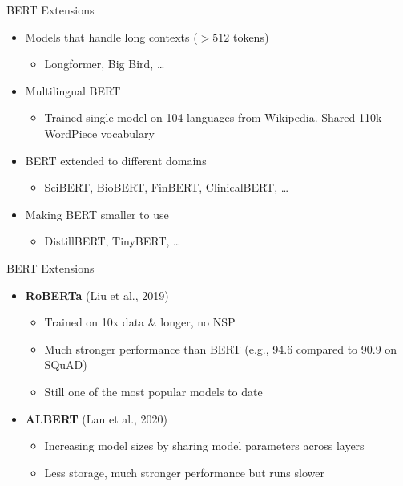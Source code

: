 \documentclass[serif, aspectratio=169]{beamer}
\begin{document}
\begin{frame}{BERT Extensions}
    \begin{itemize}
        \item Models that handle long contexts ($> 512$ tokens)
        \begin{itemize}
            \item Longformer, Big Bird, \dots
        \end{itemize}
        
        \item Multilingual BERT
        \begin{itemize}
            \item Trained single model on 104 languages from Wikipedia. Shared 110k WordPiece vocabulary
        \end{itemize}
        
        \item BERT extended to different domains
        \begin{itemize}
            \item SciBERT, BioBERT, FinBERT, ClinicalBERT, \dots
        \end{itemize}
        
        \item Making BERT smaller to use
        \begin{itemize}
            \item DistillBERT, TinyBERT, \dots
        \end{itemize}
    \end{itemize}
\end{frame}

\begin{frame}{BERT Extensions}
    \begin{itemize}
        \item \textbf{RoBERTa} {\color{green}(Liu et al., 2019)}
        \vspace{0.3cm}
        \begin{itemize}
            \item Trained on 10x data \& longer, no NSP
            \item Much stronger performance than BERT (e.g., 94.6 compared to 90.9 on SQuAD)
            \item Still one of the most popular models to date
        \end{itemize}
        \vspace{0.5cm}
        \item \textbf{ALBERT} {\color{green}(Lan et al., 2020)}
        \vspace{0.3}
        \begin{itemize}
            \item Increasing model sizes by sharing model parameters across layers
            \item Less storage, much stronger performance but runs slower
        \end{itemize}
    \end{itemize}
\end{frame}
\end{document}
